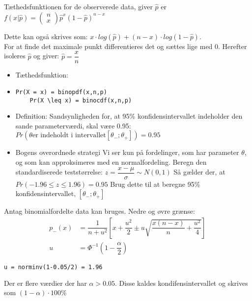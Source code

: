 \documentclass[Main]{subfiles}
\begin{document}
\begin{theo}
Tæthedsfunktionen for de observerede data, giver $\hat{p}$ er $f(x|\hat{p}) = \left(\begin{matrix}
	n\\
	x
	\end{matrix}\right) \hat{p}^x (1-\hat{p})^{n-x}$

Dette kan også skrives som:
$x \cdot log(\hat{p}) + (n-x) \cdot log(1-\hat{p})$.
\\
For at finde det maximale punkt differentieres det og sættes lige med 0. 
Herefter isoleres $\hat{p}$ og giver:
$\hat{p} = \dfrac{x}{n}$
\end{theo}



\begin{theo}
\begin{itemize}
	\item Tæthedsfunktion:
	\item[] \begin{lstlisting}[style=Code-Matlab]
	Pr(X = x) = binopdf(x,n,p)
	Pr(X \leq x) = binocdf(x,n,p)
	\end{lstlisting}
\end{itemize}
\end{theo}



\begin{theo}[95\% konfidensinterval]

\begin{itemize}
	\item Definition:
\subitem Sandsynligheden for, at 95\% konfidensintervallet indeholder den sande parameterværdi, skal være 0.95:
$Pr(\theta \text{er indeholdt i intervallet} [\theta_- ; \theta_+]) = 0.95$
\item Bogens overordnede strategi
\subitem Vi ser kun på fordelinger, som har parameter $\theta$, og som kan approksimeres med en normalfordeling.
\subitem Beregn den standardiserede teststørrelse: $z= \dfrac{x-\mu}{\sigma} \sim N(0,1)$
Så gælder der, at $Pr(-1.96 \leq z \leq 1.96) = 0.95$
\subitem Brug dette til at beregne 95\% konfidensintervallet, $[\theta_- ; \theta_+]$
\end{itemize}

Antag binomialfordelte data kan bruges.
Nedre og øvre grænse:
\begin{align*}
p_-(x) &= \dfrac{1}{n+u^2} \left[x+\dfrac{u^2}{2}\pm u \sqrt{\dfrac{x(n-x)}{n} + \dfrac{u^2}{4}}\right]\\
u &= \Phi^{-1}(1- \dfrac{\alpha}{2})
\end{align*}
\begin{lstlisting}[style=Code-Matlab]
u = norminv(1-0.05/2) = 1.96
\end{lstlisting}

Der er flere værdier der har $\alpha > 0.05$.
Disse kaldes kondifensintervallet og skrives som $(1-\alpha) \cdot 100\% $

\end{theo}
\end{document}
